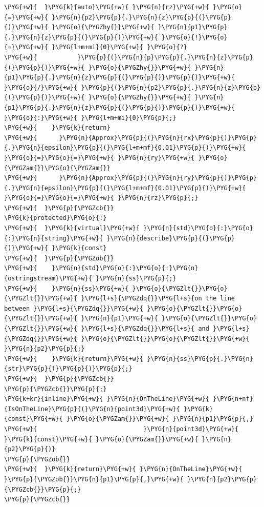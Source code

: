 \begin{codeblockbg}
\begin{Verbatim}[commandchars=\\\{\},breaklines=true,breakanywhere=true,fontsize=\codefont,xleftmargin=17bp]
\PYG{+w}{  }\PYG{k}{auto}\PYG{+w}{ }\PYG{n}{rz}\PYG{+w}{ }\PYG{o}{=}\PYG{+w}{ }\PYG{n}{p2}\PYG{p}{.}\PYG{n}{z}\PYG{p}{(}\PYG{p}{)}\PYG{+w}{ }\PYG{o}{\PYGZhy{}}\PYG{+w}{ }\PYG{n}{p1}\PYG{p}{.}\PYG{n}{z}\PYG{p}{(}\PYG{p}{)}\PYG{+w}{ }\PYG{o}{!}\PYG{o}{=}\PYG{+w}{ }\PYG{l+m+mi}{0}\PYG{+w}{ }\PYG{o}{?}
\PYG{+w}{           }\PYG{p}{(}\PYG{n}{p}\PYG{p}{.}\PYG{n}{z}\PYG{p}{(}\PYG{p}{)}\PYG{+w}{ }\PYG{o}{\PYGZhy{}}\PYG{+w}{ }\PYG{n}{p1}\PYG{p}{.}\PYG{n}{z}\PYG{p}{(}\PYG{p}{)}\PYG{p}{)}\PYG{+w}{ }\PYG{o}{/}\PYG{+w}{ }\PYG{p}{(}\PYG{n}{p2}\PYG{p}{.}\PYG{n}{z}\PYG{p}{(}\PYG{p}{)}\PYG{+w}{ }\PYG{o}{\PYGZhy{}}\PYG{+w}{ }\PYG{n}{p1}\PYG{p}{.}\PYG{n}{z}\PYG{p}{(}\PYG{p}{)}\PYG{p}{)}\PYG{+w}{ }\PYG{o}{:}\PYG{+w}{ }\PYG{l+m+mi}{0}\PYG{p}{;}
\PYG{+w}{    }\PYG{k}{return}
\PYG{+w}{      }\PYG{n}{Approx}\PYG{p}{(}\PYG{n}{rx}\PYG{p}{)}\PYG{p}{.}\PYG{n}{epsilon}\PYG{p}{(}\PYG{l+m+mf}{0.01}\PYG{p}{)}\PYG{+w}{ }\PYG{o}{=}\PYG{o}{=}\PYG{+w}{ }\PYG{n}{ry}\PYG{+w}{ }\PYG{o}{\PYGZam{}}\PYG{o}{\PYGZam{}}
\PYG{+w}{      }\PYG{n}{Approx}\PYG{p}{(}\PYG{n}{ry}\PYG{p}{)}\PYG{p}{.}\PYG{n}{epsilon}\PYG{p}{(}\PYG{l+m+mf}{0.01}\PYG{p}{)}\PYG{+w}{ }\PYG{o}{=}\PYG{o}{=}\PYG{+w}{ }\PYG{n}{rz}\PYG{p}{;}
\PYG{+w}{  }\PYG{p}{\PYGZcb{}}
\PYG{k}{protected}\PYG{o}{:}
\PYG{+w}{  }\PYG{k}{virtual}\PYG{+w}{ }\PYG{n}{std}\PYG{o}{:}\PYG{o}{:}\PYG{n}{string}\PYG{+w}{ }\PYG{n}{describe}\PYG{p}{(}\PYG{p}{)}\PYG{+w}{ }\PYG{k}{const}
\PYG{+w}{  }\PYG{p}{\PYGZob{}}
\PYG{+w}{    }\PYG{n}{std}\PYG{o}{:}\PYG{o}{:}\PYG{n}{ostringstream}\PYG{+w}{ }\PYG{n}{ss}\PYG{p}{;}
\PYG{+w}{    }\PYG{n}{ss}\PYG{+w}{ }\PYG{o}{\PYGZlt{}}\PYG{o}{\PYGZlt{}}\PYG{+w}{ }\PYG{l+s}{\PYGZdq{}}\PYG{l+s}{on the line between }\PYG{l+s}{\PYGZdq{}}\PYG{+w}{ }\PYG{o}{\PYGZlt{}}\PYG{o}{\PYGZlt{}}\PYG{+w}{ }\PYG{n}{p1}\PYG{+w}{ }\PYG{o}{\PYGZlt{}}\PYG{o}{\PYGZlt{}}\PYG{+w}{ }\PYG{l+s}{\PYGZdq{}}\PYG{l+s}{ and }\PYG{l+s}{\PYGZdq{}}\PYG{+w}{ }\PYG{o}{\PYGZlt{}}\PYG{o}{\PYGZlt{}}\PYG{+w}{ }\PYG{n}{p2}\PYG{p}{;}
\PYG{+w}{    }\PYG{k}{return}\PYG{+w}{ }\PYG{n}{ss}\PYG{p}{.}\PYG{n}{str}\PYG{p}{(}\PYG{p}{)}\PYG{p}{;}
\PYG{+w}{  }\PYG{p}{\PYGZcb{}}
\PYG{p}{\PYGZcb{}}\PYG{p}{;}
\PYG{k+kr}{inline}\PYG{+w}{ }\PYG{n}{OnTheLine}\PYG{+w}{ }\PYG{n+nf}{IsOnTheLine}\PYG{p}{(}\PYG{n}{point3d}\PYG{+w}{ }\PYG{k}{const}\PYG{+w}{ }\PYG{o}{\PYGZam{}}\PYG{+w}{ }\PYG{n}{p1}\PYG{p}{,}
\PYG{+w}{                             }\PYG{n}{point3d}\PYG{+w}{ }\PYG{k}{const}\PYG{+w}{ }\PYG{o}{\PYGZam{}}\PYG{+w}{ }\PYG{n}{p2}\PYG{p}{)}
\PYG{p}{\PYGZob{}}
\PYG{+w}{  }\PYG{k}{return}\PYG{+w}{ }\PYG{n}{OnTheLine}\PYG{+w}{ }\PYG{p}{\PYGZob{}}\PYG{n}{p1}\PYG{p}{,}\PYG{+w}{ }\PYG{n}{p2}\PYG{p}{\PYGZcb{}}\PYG{p}{;}
\PYG{p}{\PYGZcb{}}
\end{Verbatim}
\end{codeblockbg}


